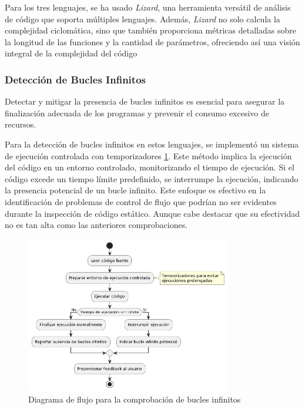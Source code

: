 Para los tres lenguajes, se ha usado \textit{Lizard}, una herramienta versátil de análisis de código que soporta múltiples lenguajes. Además, \textit{Lizard} no solo calcula la complejidad ciclomática, sino que también proporciona métricas detalladas sobre la longitud de las funciones y la cantidad de parámetros, ofreciendo así una visión integral de la complejidad del código

\subsubsection*{Detección de Bucles Infinitos}
Detectar y mitigar la presencia de bucles infinitos es esencial para asegurar la finalización adecuada de los programas y prevenir el consumo excesivo de recursos.

Para la detección de bucles infinitos en estos lenguajes, se implementó un sistema de ejecución controlada con temporizadores \ref{fig:comprobaciones}. Este método implica la ejecución del código en un entorno controlado, monitorizando el tiempo de ejecución. Si el código excede un tiempo límite predefinido, se interrumpe la ejecución, indicando la presencia potencial de un bucle infinito. Este enfoque es efectivo en la identificación de problemas de control de flujo que podrían no ser evidentes durante la inspección de código estático. Aunque cabe destacar que su efectividad no es tan alta como las anteriores comprobaciones. 

\begin{figure}[H]
    \centering
    \includegraphics[width=0.8\textwidth]{imagenes/buclesinfinitos.png}
    \caption{Diagrama de flujo para la comprobación de bucles infinitos}
    \label{fig:comprobaciones}
\end{figure}

